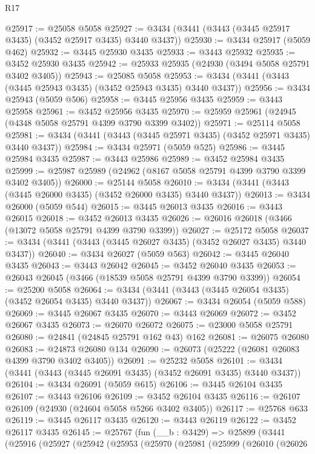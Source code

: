 \begin{lexlean}{R17}
\begin{coremodule}
@25917 := @25058 @5058
@25927 := @3434 (@3441 (@3443 (@3445 @25917 @3435) (@3452 @25917 @3435) @3440 @3437))
@25930 := @3434 @25917 (@5059 @462)
@25932 := @3445 @25930 @3435
@25933 := @3443 @25932
@25935 := @3452 @25930 @3435
@25942 := @25933 @25935 (@24930 (@3494 @5058 @25791 @3402 @3405))
@25943 := @25085 @5058
@25953 := @3434 (@3441 (@3443 (@3445 @25943 @3435) (@3452 @25943 @3435) @3440 @3437))
@25956 := @3434 @25943 (@5059 @506)
@25958 := @3445 @25956 @3435
@25959 := @3443 @25958
@25961 := @3452 @25956 @3435
@25970 := @25959 @25961 (@24945 (@4348 @5058 @25791 @4399 @3790 @3399 @3402))
@25971 := @25114 @5058
@25981 := @3434 (@3441 (@3443 (@3445 @25971 @3435) (@3452 @25971 @3435) @3440 @3437))
@25984 := @3434 @25971 (@5059 @525)
@25986 := @3445 @25984 @3435
@25987 := @3443 @25986
@25989 := @3452 @25984 @3435
@25999 := @25987 @25989 (@24962 (@8167 @5058 @25791 @4399 @3790 @3399 @3402 @3405))
@26000 := @25144 @5058
@26010 := @3434 (@3441 (@3443 (@3445 @26000 @3435) (@3452 @26000 @3435) @3440 @3437))
@26013 := @3434 @26000 (@5059 @544)
@26015 := @3445 @26013 @3435
@26016 := @3443 @26015
@26018 := @3452 @26013 @3435
@26026 := @26016 @26018 (@3466 (@13072 @5058 @25791 @4399 @3790 @3399))
@26027 := @25172 @5058
@26037 := @3434 (@3441 (@3443 (@3445 @26027 @3435) (@3452 @26027 @3435) @3440 @3437))
@26040 := @3434 @26027 (@5059 @563)
@26042 := @3445 @26040 @3435
@26043 := @3443 @26042
@26045 := @3452 @26040 @3435
@26053 := @26043 @26045 (@3466 (@18539 @5058 @25791 @4399 @3790 @3399))
@26054 := @25200 @5058
@26064 := @3434 (@3441 (@3443 (@3445 @26054 @3435) (@3452 @26054 @3435) @3440 @3437))
@26067 := @3434 @26054 (@5059 @588)
@26069 := @3445 @26067 @3435
@26070 := @3443 @26069
@26072 := @3452 @26067 @3435
@26073 := @26070 @26072
@26075 := @23000 @5058 @25791
@26080 := @24841 (@24845 @25791 @162 @43) @162
@26081 := @26075 @26080
@26083 := @24873 @26080 @134
@26090 := @26073 (@25222 (@26081 @26083 @4399 @3790 @3402 @3405))
@26091 := @25232 @5058
@26101 := @3434 (@3441 (@3443 (@3445 @26091 @3435) (@3452 @26091 @3435) @3440 @3437))
@26104 := @3434 @26091 (@5059 @615)
@26106 := @3445 @26104 @3435
@26107 := @3443 @26106
@26109 := @3452 @26104 @3435
@26116 := @26107 @26109 (@24930 (@24604 @5058 @5266 @3402 @3405))
@26117 := @25768 @633
@26119 := @3445 @26117 @3435
@26120 := @3443 @26119
@26122 := @3452 @26117 @3435
@26145 := @25767
    (fun (__b : @3429) =>
    @25899
      (@3441
        (@25916
          (@25927
            (@25942
              (@25953
                (@25970
                  (@25981
                    (@25999
                      (@26010
                        (@26026

\end{coremodule}
\end{lexlean}
